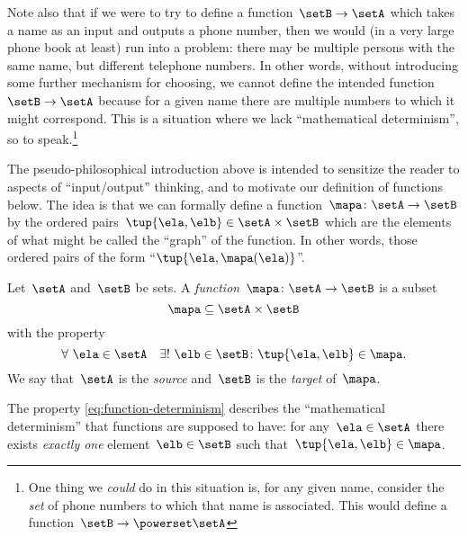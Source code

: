 Note also that if we were to try to define a function~$\setB \to \setA$ which takes a name as an input and outputs a phone number, then we would (in a very large phone book at least) run into a problem: there may be multiple persons with the same name, but different telephone numbers.
In other words, without introducing some further mechanism for choosing, we cannot define the intended function~$\setB \to \setA$ because for a given name there are multiple numbers to which it might correspond.
This is a situation where we lack ``mathematical determinism'', so to speak.\footnote{One thing we \emph{could} do in this situation is, for any given name, consider the \emph{set} of phone numbers to which that name is associated.
This would define a function~$\setB \to \powerset \setA$}

The pseudo-philosophical introduction above is intended to sensitize the reader to aspects of ``input/output'' thinking, and to motivate our definition of functions below.
The idea is that we can formally define a function~$\mapa\colon \setA \to \setB$ by the ordered pairs~$\tup{\ela, \elb} \in \setA \times \setB$ which are the elements of what might be called the ``graph'' of the function.
In other words, those ordered pairs of the form ``$\tup{\ela, \mapa(\ela)}$''.

\begin{definition}
    \label{def:function}
    Let~$\setA$ and~$\setB$ be sets. A \emph{function}~$\mapa\colon \setA \to \setB$ is a subset
    \begin{equation*}
        \mapa \subseteq \setA \times \setB
    \end{equation*}
    with the property
    \begin{equation}
        \label{eq:function-determinism}
        \forall \ \ela \in \setA  \quad  \exists ! \ \elb \in \setB \colon \tup{\ela,\elb} \in \mapa.
    \end{equation}
    We say that~$\setA$ is the \emph{source} and~$\setB$ is the \emph{target} of~$\mapa$.
\end{definition}



The property \cref{eq:function-determinism} describes the ``mathematical determinism'' that functions are supposed to have:
for any~$\ela \in \setA$ there exists \emph{exactly one} element~$\elb \in \setB$ such that~$\tup{\ela, \elb} \in \mapa$.

